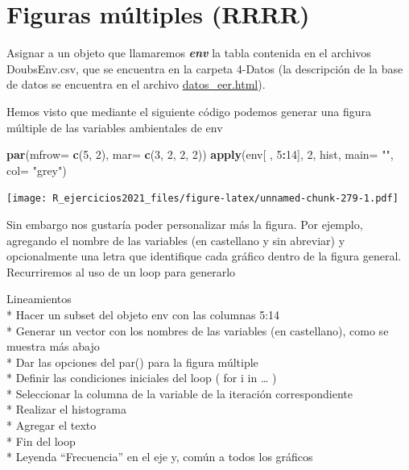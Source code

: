 \documentclass[]{book}
\newenvironment{Shaded}{\begin{snugshade}}{\end{snugshade}}
\newcommand{\DataTypeTok}[1]{\textcolor[rgb]{0.13,0.29,0.53}{#1}}
\newcommand{\DecValTok}[1]{\textcolor[rgb]{0.00,0.00,0.81}{#1}}
\newcommand{\KeywordTok}[1]{\textcolor[rgb]{0.13,0.29,0.53}{\textbf{#1}}}
\newcommand{\NormalTok}[1]{#1}
\newcommand{\OperatorTok}[1]{\textcolor[rgb]{0.81,0.36,0.00}{\textbf{#1}}}
\newcommand{\StringTok}[1]{\textcolor[rgb]{0.31,0.60,0.02}{#1}}
\begin{document}
\hypertarget{figuras-muxfaltiples-rrrr}{%
\section{Figuras múltiples (RRRR)}\label{figuras-muxfaltiples-rrrr}}

Asignar a un objeto que llamaremos \textbf{\emph{env}} la tabla contenida en el archivos DoubsEnv.csv, que se encuentra en la carpeta 4-Datos (la descripción de la base de datos se encuentra en el archivo \url{datos_eer.html}).

Hemos visto que mediante el siguiente código podemos generar una figura múltiple de las variables ambientales de env

\begin{Shaded}
\begin{Highlighting}[]
\KeywordTok{par}\NormalTok{(}\DataTypeTok{mfrow=} \KeywordTok{c}\NormalTok{(}\DecValTok{5}\NormalTok{, }\DecValTok{2}\NormalTok{), }\DataTypeTok{mar=} \KeywordTok{c}\NormalTok{(}\DecValTok{3}\NormalTok{, }\DecValTok{2}\NormalTok{, }\DecValTok{2}\NormalTok{, }\DecValTok{2}\NormalTok{))}
\KeywordTok{apply}\NormalTok{(env[ , }\DecValTok{5}\OperatorTok{:}\DecValTok{14}\NormalTok{], }\DecValTok{2}\NormalTok{, hist, }\DataTypeTok{main=} \StringTok{""}\NormalTok{, }\DataTypeTok{col=} \StringTok{"grey"}\NormalTok{)}
\end{Highlighting}
\end{Shaded}

\texttt{[image: R\_ejercicios2021\_files/figure-latex/unnamed-chunk-279-1.pdf]}

Sin embargo nos gustaría poder personalizar más la figura. Por ejemplo, agregando el nombre de las variables (en castellano y sin abreviar) y opcionalmente una letra que identifique cada gráfico dentro de la figura general. Recurriremos al uso de un loop para generarlo

Lineamientos\\
* Hacer un subset del objeto env con las columnas 5:14\\
* Generar un vector con los nombres de las variables (en castellano), como se muestra más abajo\\
* Dar las opciones del par() para la figura múltiple\\
* Definir las condiciones iniciales del loop ( for i in \ldots{} )\\
* Seleccionar la columna de la variable de la iteración correspondiente\\
* Realizar el histograma\\
* Agregar el texto\\
* Fin del loop\\
* Leyenda ``Frecuencia'' en el eje y, común a todos los gráficos
\end{document}
